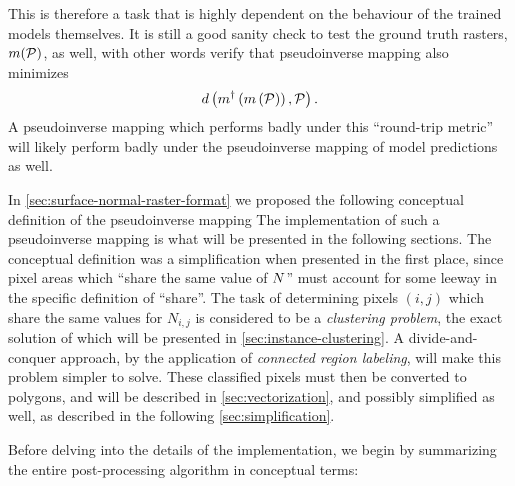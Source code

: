 This is therefore a task that is highly dependent on the behaviour of the trained models themselves.
It is still a good sanity check to test the ground truth rasters, $m(\mathcal{P})$, as well, with other words verify that pseudoinverse mapping also minimizes
\begin{equation*}
  d\left(
    m^{\dagger}\left(m\left(\mathcal{P}\right)\right),
    \mathcal{P}
  \right).
\end{equation*}
A pseudoinverse mapping which performs badly under this \enquote{round-trip metric} will likely perform badly under the pseudoinverse mapping of model predictions as well.

In \cref{sec:surface-normal-raster-format} we proposed the following conceptual definition of the pseudoinverse mapping
\noindent
The implementation of such a pseudoinverse mapping is what will be presented in the following sections.
The conceptual definition was a simplification when presented in the first place, since pixel areas which \enquote{share the same value of $N$} must account for some leeway in the specific definition of \enquote{share}.
The task of determining pixels $(i, j)$ which share the same values for $N_{i, j}$ is considered to be a \textit{clustering problem}, the exact solution of which will be presented in \cref{sec:instance-clustering}.
A divide-and-conquer approach, by the application of \textit{connected region labeling}, will make this problem simpler to solve.
These classified pixels must then be converted to polygons, and will be described in \cref{sec:vectorization}, and possibly simplified as well, as described in the following \cref{sec:simplification}.

Before delving into the details of the implementation, we begin by summarizing the entire post-processing algorithm in conceptual terms:

